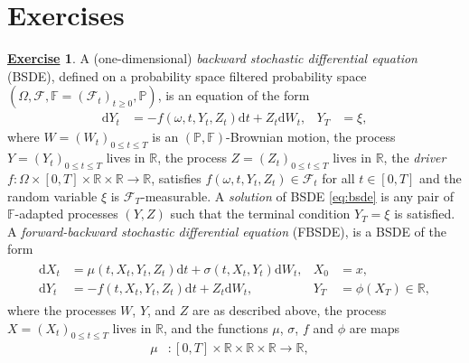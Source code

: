 \documentclass[12pt]{book}
\let\varphi\phi
\numberwithin{equation}{chapter}
\theoremstyle{plain}
\numberwithin{theorem}{section}
\theoremstyle{definition}
\newtheorem{exercise}{\underline{Exercise}}
\numberwithin{exercise}{chapter}
\newcommand{\<}{\langle}
\renewcommand{\>}{\rangle}
\renewcommand{\(}{\left(}
\renewcommand{\)}{\right)}
\renewcommand{\[}{\left[}
\renewcommand{\]}{\right]}
\newcommand\Fb{\mathds{F}}
\newcommand\Pb{\mathds{P}}
\newcommand\Rb{\mathds{R}}
\newcommand\Fc{\mathscr{F}}
\newcommand\om{\omega}
\newcommand\Om{\Omega}
\newcommand\sig{\sigma}
\newcommand\dd{\mathrm{d}}
\begin{document}


\section{Exercises}
\label{sec:exercises-9}

\begin{exercise}
\label{exer:9.1}
A (one-dimensional) \emph{backward stochastic differential equation} (BSDE), defined on a probability space filtered probability space $(\Om,\Fc,\Fb=(\Fc_t)_{t \geq 0},\Pb)$, is an equation of the form
\begin{align}
\dd Y_t
	&=	- f(\om,t,Y_t,Z_t) \dd t + Z_t \dd W_t , &
Y_T
	&=	\xi , \label{eq:bsde}
\end{align}
where $W=(W_t)_{0 \leq t \leq T}$ is an $(\Pb,\Fb)$-Brownian motion, the process $Y=(Y_t)_{0 \leq t \leq T}$ lives in $\Rb$, the process $Z=(Z_t)_{0 \leq t \leq T}$ lives in $\Rb$, the \emph{driver} $f: \Om \times [0,T] \times \Rb \times \Rb \to \Rb$, satisfies $f(\om,t,Y_t,Z_t) \in \Fc_t$ for all $t \in [0,T]$ and the random variable $\xi$ is $\Fc_T$-measurable.  A \emph{solution} of BSDE \eqref{eq:bsde} is any pair of $\Fb$-adapted processes $(Y,Z)$ such that the terminal condition $Y_T = \xi$ is satisfied.  A \emph{forward-backward stochastic differential equation} (FBSDE), is a BSDE of the form
\begin{align}
\begin{aligned}
\dd X_t
	&=	\mu(t,X_t,Y_t,Z_t) \dd t + \sig(t,X_t,Y_t) \dd W_t , &
X_0
	&=	x , \\
\dd Y_t
	&=	- f(t,X_t,Y_t,Z_t) \dd t + Z_t \dd W_t , &
Y_T
	&=	\varphi(X_T) \in \Rb, 
\end{aligned} \label{eq:fbsde}
\end{align}
where the processes $W$, $Y$, and $Z$ are as described above, the process $X = (X_t)_{0 \leq t \leq T}$ lives in $\Rb$, and the functions $\mu$, $\sig$, $f$ and $\varphi$ are maps
\begin{align}
\mu
	&: [0,T] \times \Rb \times \Rb \times \Rb \to \Rb , &

\end{align}
\end{exercise}
\end{document}
